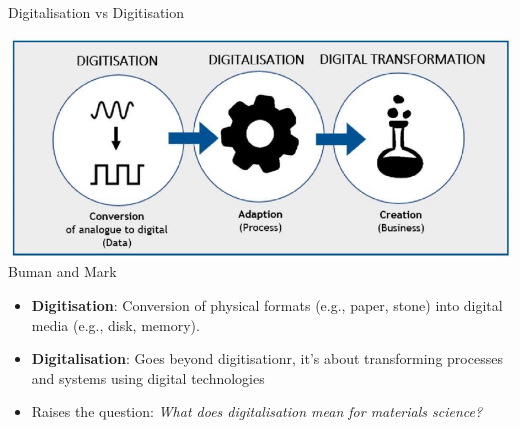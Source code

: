 \documentclass[aspectratio=169]{beamer}
\begin{document}
\begin{frame}{Digitalisation vs Digitisation}
    \begin{center}
        \includegraphics[width=0.4\linewidth]{media/digi_digi.png}
        {\tiny Buman and Mark}
    \end{center}

    \vspace{1em}
    \begin{itemize}
        \item \textbf{Digitisation}: Conversion of physical formats (e.g., paper, stone) into digital media (e.g., disk, memory).
        \item \textbf{Digitalisation}: Goes beyond digitisationr, it's about transforming processes and systems using digital technologies
        \item Raises the question: \textit{What does digitalisation mean for materials science?}
    \end{itemize}
\end{frame}
\end{document}
